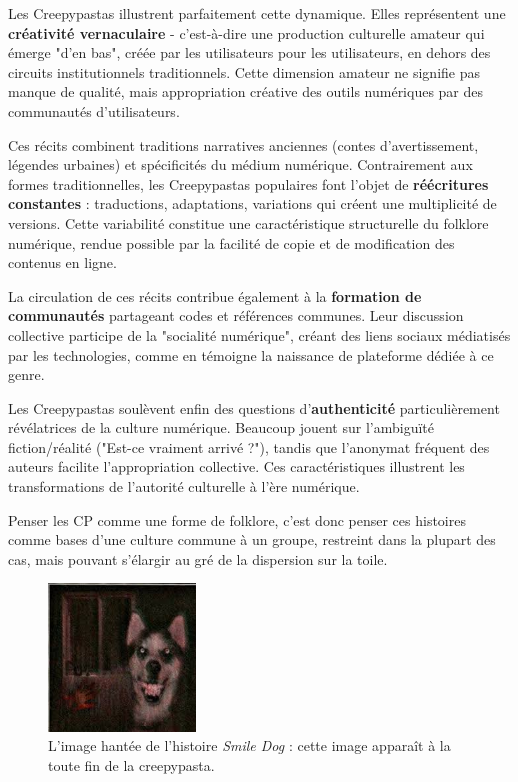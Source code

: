 \documentclass[12pt,a4paper,oneside,titlepage]{book} %
\begin{document}
Les Creepypastas illustrent parfaitement cette dynamique. Elles représentent une \textbf{créativité vernaculaire} - c'est-à-dire une production culturelle amateur qui émerge "d'en bas", créée par les utilisateurs pour les utilisateurs, en dehors des circuits institutionnels traditionnels. Cette dimension amateur ne signifie pas manque de qualité, mais appropriation créative des outils numériques par des communautés d'utilisateurs.

Ces récits combinent traditions narratives anciennes (contes d'avertissement, légendes urbaines) et spécificités du médium numérique. Contrairement aux formes traditionnelles, les Creepypastas populaires font l'objet de \textbf{réécritures constantes} : traductions, adaptations, variations qui créent une multiplicité de versions. Cette variabilité constitue une caractéristique structurelle du folklore numérique, rendue possible par la facilité de copie et de modification des contenus en ligne.

La circulation de ces récits contribue également à la \textbf{formation de communautés} partageant codes et références communes. Leur discussion collective participe de la "socialité numérique", créant des liens sociaux médiatisés par les technologies, comme en témoigne la naissance de plateforme dédiée à ce genre.

Les Creepypastas soulèvent enfin des questions d'\textbf{authenticité} particulièrement révélatrices de la culture numérique. Beaucoup jouent sur l'ambiguïté fiction/réalité ("Est-ce vraiment arrivé ?"), tandis que l'anonymat fréquent des auteurs facilite l'appropriation collective. Ces caractéristiques illustrent les transformations de l'autorité culturelle à l'ère numérique.

Penser les CP comme une forme de folklore, c'est donc penser ces histoires comme bases d'une culture commune à un groupe, restreint dans la plupart des cas, mais pouvant s'élargir au gré de la dispersion sur la toile. 

\begin{figure}
\centering
\includegraphics[width=0.35\textwidth]{illustration/smile_dog.jpg}
\small
\caption{L'image hantée de l'histoire \textit{Smile Dog} : cette image apparaît à la toute fin de la creepypasta.}
\label{fig:smile_dog}
\end{figure}
\end{document}
